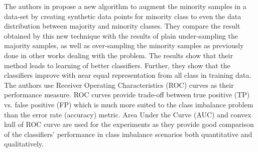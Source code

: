 \documentclass[10pt,journal,compsoc]{IEEEtran}
\begin{document}
The authors in \cite{smote} propose a new algorithm to augment the minority samples in a data-set by creating synthetic data points for minority class to even the data distribution between majority and minority classes. They compare the result obtained by this new technique with the results of plain under-sampling the majority samples, as well as over-sampling the minority samples as previously done in other works dealing with the problem.  The results show that their method leads to learning of better classifiers. Further, they show that the classifiers improve with near equal representation from all class in training data. The authors use Receiver Operating Characteristics (ROC) curves as their performance measure. ROC curves provide trade-off between true positive (TP) vs. false positive (FP) which is much more suited to the class imbalance problem than the error rate (accuracy) metric. Area Under the Curve (AUC) and convex hull of ROC curve are used for the experiments as they provide good comparison of the classifiers' performance in class imbalance scenarios both quantitative and qualitatively. 

\end{document}
